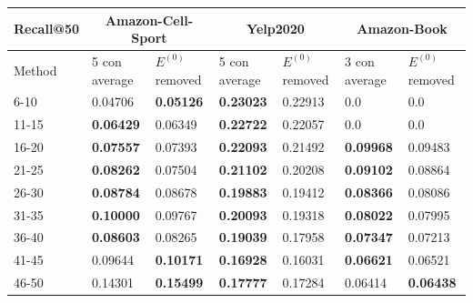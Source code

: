 \begin{table}[h!]
    \centering
    \begin{tabular}{|l|l|l||l|l||l|l|}
        \hline
        Recall@50 & \multicolumn{2}{c||}{Amazon-Cell-Sport} & \multicolumn{2}{c||}{Yelp2020} & \multicolumn{2}{c|}{Amazon-Book}                                                            \\ \hline
        Method    & 5 con average                           & $E^{(0)}$ removed              & 5 con average                    & $E^{(0)}$ removed & 3 con average    & $E^{(0)}$ removed \\ \hline
        6-10      & 0.04706                                 & \textbf{0.05126}               & \textbf{0.23023}                 & 0.22913           & 0.0              & 0.0               \\ \hline
        11-15     & \textbf{0.06429}                        & 0.06349                        & \textbf{0.22722}                 & 0.22057           & 0.0              & 0.0               \\ \hline
        16-20     & \textbf{0.07557}                        & 0.07393                        & \textbf{0.22093}                 & 0.21492           & \textbf{0.09968} & 0.09483           \\ \hline
        21-25     & \textbf{0.08262}                        & 0.07504                        & \textbf{0.21102}                 & 0.20208           & \textbf{0.09102} & 0.08864           \\ \hline
        26-30     & \textbf{0.08784}                        & 0.08678                        & \textbf{0.19883}                 & 0.19412           & \textbf{0.08366} & 0.08086           \\ \hline
        31-35     & \textbf{0.10000}                        & 0.09767                        & \textbf{0.20093}                 & 0.19318           & \textbf{0.08022} & 0.07995           \\ \hline
        36-40     & \textbf{0.08603}                        & 0.08265                        & \textbf{0.19039}                 & 0.17958           & \textbf{0.07347} & 0.07213           \\ \hline
        41-45     & 0.09644                                 & \textbf{0.10171}               & \textbf{0.16928}                 & 0.16031           & \textbf{0.06621} & 0.06521           \\ \hline
        46-50     & 0.14301                                 & \textbf{0.15499}               & \textbf{0.17777}                 & 0.17284           & 0.06414          & \textbf{0.06438}  \\ \hline

\end{tabular}
\end{table}
